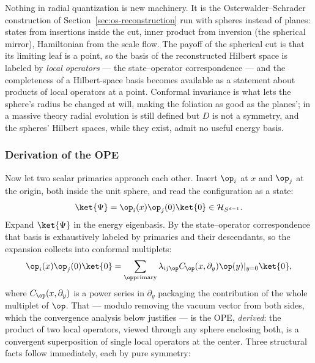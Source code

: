 \begin{iintuition}
\label{int:radial}
Nothing in radial quantization is new machinery. It is the
Osterwalder--Schrader construction of Section~\ref{sec:os-reconstruction} run
with spheres instead of planes: states from insertions inside the cut, inner
product from inversion (the spherical mirror), Hamiltonian from the scale
flow. The payoff of the spherical cut is that its limiting leaf is a point, so
the basis of the reconstructed Hilbert space is labeled by \emph{local
operators} --- the state--operator correspondence --- and the completeness of
a Hilbert-space basis becomes available as a statement about products of local
operators at a point. Conformal invariance is what lets the sphere's radius be
changed at will, making the foliation as good as the planes'; in a massive
theory radial evolution is still defined but $D$ is not a symmetry, and the
spheres' Hilbert spaces, while they exist, admit no useful energy basis.
\end{iintuition}

\subsubsection{Derivation of the OPE}
\label{sec:ope-derivation}

Now let two scalar primaries approach each other. Insert $\op_i$ at $x$ and
$\op_j$ at the origin, both inside the unit sphere, and read the
configuration as a state:
\begin{equation}
\ket{\Psi} = \op_i(x)\op_j(0)\ket{0} \in \mathcal{H}_{S^{d-1}}.
\end{equation}
Expand $\ket{\Psi}$ in the energy eigenbasis. By the state--operator
correspondence that basis is exhaustively labeled by primaries and their
descendants, so the expansion collects into conformal multiplets:
\begin{equation}
\op_i(x) \op_j(0)\ket{0}
= \sum_{\op \rm primary} \lambda_{ij\op}
C_{\op}(x, \partial_y) \op(y)|_{y=0}\ket{0},
\label{eq:ope-radial}
\end{equation}
where $C_\op(x,\partial_y)$ is a power series in $\partial_y$ packaging the
contribution of the whole multiplet of $\op$. That --- modulo removing the
vacuum vector from both sides, which the convergence analysis below justifies
--- is the OPE, \emph{derived}: the product of two local operators, viewed
through any sphere enclosing both, is a convergent superposition of single
local operators at the center. Three structural facts follow immediately, each
by pure symmetry:


